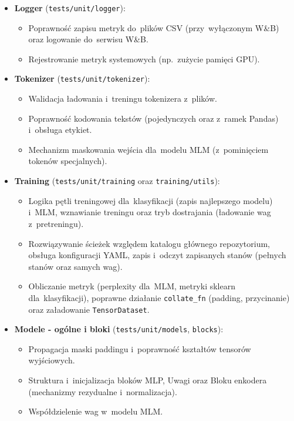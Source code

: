 \documentclass[a4paper,11pt,twoside]{report}
\theoremstyle{definition}
\begin{document}
\begin{itemize}
    \item \textbf{Logger} (\texttt{tests/unit/logger}):
    \begin{itemize}
        \item Poprawność zapisu metryk do~plików CSV (przy~wyłączonym W\&B) oraz logowanie do~serwisu W\&B.
        \item Rejestrowanie metryk systemowych (np.\ zużycie pamięci GPU).
    \end{itemize}

    \item \textbf{Tokenizer} (\texttt{tests/unit/tokenizer}):
    \begin{itemize}
        \item Walidacja ładowania i~treningu tokenizera z~plików.
        \item Poprawność kodowania tekstów (pojedynczych oraz z~ramek Pandas) i~obsługa etykiet.
        \item Mechanizm maskowania wejścia dla~modelu MLM (z~pominięciem tokenów specjalnych).
    \end{itemize}

    \item \textbf{Training} (\texttt{tests/unit/training} oraz \texttt{training/utils}):
    \begin{itemize}
        \item Logika pętli treningowej dla~klasyfikacji (zapis najlepszego modelu) i~MLM, wznawianie treningu oraz tryb dostrajania (ładowanie wag z~pretreningu).
        \item Rozwiązywanie ścieżek względem katalogu głównego repozytorium, obsługa konfiguracji YAML, zapis i~odczyt zapisanych stanów (pełnych stanów oraz samych wag).
        \item Obliczanie metryk (perplexity dla~MLM, metryki sklearn dla~klasyfikacji), poprawne działanie \texttt{collate\_fn} (padding, przycinanie) oraz załadowanie \texttt{TensorDataset}.
    \end{itemize}

    \item \textbf{Modele - ogólne i bloki} (\texttt{tests/unit/models}, \texttt{blocks}):
    \begin{itemize}
        \item Propagacja maski paddingu i~poprawność kształtów tensorów wyjściowych.
        \item Struktura i~inicjalizacja bloków MLP, Uwagi oraz Bloku enkodera (mechanizmy rezydualne i~normalizacja).
        \item Współdzielenie wag w~modelu MLM.
    \end{itemize}


\end{itemize}
\end{document}
